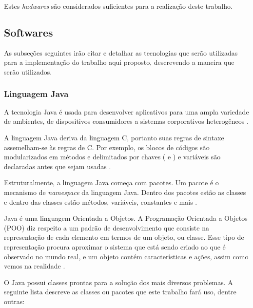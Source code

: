 Estes \textit{hadwares} são considerados suficientes para a realização deste trabalho.

\subsection{Softwares}\label{sub-softw}
As subseções seguintes irão citar e detalhar as tecnologias que serão utilizadas para a implementação do trabalho aqui proposto,  descrevendo a maneira que serão utilizados.

\subsubsection{Linguagem Java}\label{subsec:java}
A tecnologia Java é usada para desenvolver aplicativos para uma ampla variedade de ambientes, de dispositivos consumidores a sistemas corporativos heterogêneos \cite{ibm_java}. 

A linguagem Java deriva da linguagem C, portanto suas regras de sintaxe assemelham-se às regras de C. Por exemplo, os blocos de códigos são modularizados em métodos e delimitados por chaves ({ e }) e variáveis são declaradas antes que sejam usadas \cite{ibm_java}. 

Estruturalmente, a linguagem Java começa com pacotes. Um pacote é o mecanismo de \textit{namespace} da linguagem Java. Dentro dos pacotes estão as classes e dentro das classes estão métodos, variáveis, constantes e mais \cite{ibm_java}.

Java é uma linguagem Orientada a Objetos. A Programação Orientada a Objetos (POO) diz respeito a um padrão de desenvolvimento que consiste na representação de cada elemento em termos de um objeto, ou classe. Esse tipo de representação procura aproximar o sistema que está sendo criado ao que é observado no mundo real, e um objeto contém características e ações, assim como vemos na realidade \cite{dev_poo}. 

O Java possui classes prontas para a solução dos mais diversos problemas. A seguinte lista descreve as classes ou pacotes que este trabalho fará uso, dentre outras:


